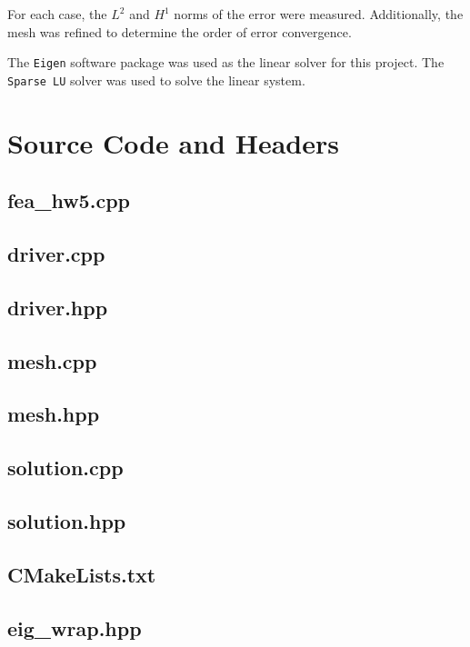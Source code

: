 \documentclass[a4paper, 12pt]{article}
\begin{document}
\noindent
For each case, the $L^2$ and $H^1$ norms of the error were measured. 
Additionally, the mesh was refined to determine the order of 
error convergence.


The \texttt{Eigen} software package
was used as the linear solver for this project. 
The \texttt{Sparse LU} solver was used to 
solve the linear system.

\newpage
\appendix
\section{Source Code and Headers} \label{sec:code}

\subsection{fea\_hw5.cpp} \label{subsec:fea_hw5.cpp}


\subsection{driver.cpp} \label{subsec:driver.cpp}

\subsection{driver.hpp} \label{subsec:driver.hpp}


\subsection{mesh.cpp} \label{subsec:mesh.cpp}

\subsection{mesh.hpp} \label{subsec:mesh.hpp}


\subsection{solution.cpp} \label{subsec:solution.cpp}

\subsection{solution.hpp} \label{subsec:solution.hpp}


\subsection{CMakeLists.txt} \label{subsec:CMakeLists.txt}


\subsection{eig\_wrap.hpp} \label{subsec:eig_wrap.hpp}

\end{document}
